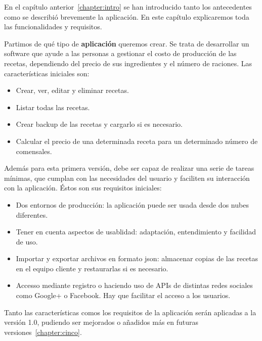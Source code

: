 %

En el capítulo anterior~\ref{chapter:intro} se han introducido tanto los antecedentes como se describió brevemente la aplicación. En este capítulo explicaremos toda las funcionalidades y requisitos.

Partimos de qué tipo de \textbf{aplicación} queremos crear. Se trata de desarrollar un software que ayude a las personas a gestionar el costo de producción de las recetas, dependiendo del precio de sus ingredientes y el número de raciones. Las características iniciales son:
\begin{itemize}
	\item Crear, ver, editar y eliminar recetas.
	\item Listar todas las recetas.
	\item Crear backup de las recetas y cargarlo si es necesario.
	\item Calcular el precio de una determinada receta para un determinado número de comensales.
\end{itemize}

Además para esta primera versión, debe ser capaz de realizar una serie de tareas mínimas, que cumplan con las necesidades del usuario y faciliten su interacción con la aplicación. Éstos son sus requisitos iniciales:
\begin{itemize}
	\item Dos entornos de producción: la aplicación puede ser usada desde dos nubes diferentes.
	\item Tener en cuenta aspectos de usablidad: adaptación, entendimiento y facilidad de uso.
	\item Importar y exportar archivos en formato json: almacenar copias de las recetas en el equipo cliente y restaurarlas si es necesario.
	\item Accesso mediante registro o haciendo uso de APIs de distintas redes sociales como Google+ o Facebook. Hay que facilitar el acceso a los usuarios.
\end{itemize}

Tanto las características comos los requisitos de la aplicación serán aplicadas a la versión 1.0, pudiendo ser mejorados o añadidos más en futuras versiones~\ref{chapter:cinco}.

%
